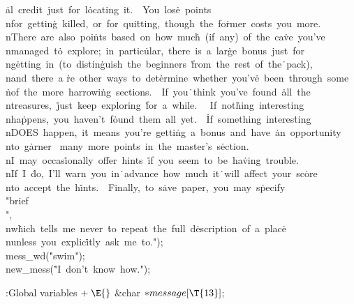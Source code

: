 \.{al\ credit\ just\ for\ l}\)\.{ocating\ it.\ \ You\ los}\)\.{e\ points\\nfor\ gettin}\)\.{g\ killed,\ or\ for\ qui}\)\.{tting,\ though\ the\ fo}\)\.{rmer\ costs\ you\ more.}\)\.{\\nThere\ are\ also\ poi}\)\.{nts\ based\ on\ how\ muc}\)\.{h\ (if\ any)\
of\ the\ ca}\)\.{ve\ you've\\nmanaged\ t}\)\.{o\ explore;\ in\ partic}\)\.{ular,\ there\ is\ a\ lar}\)\.{ge\ bonus\ just\ for\\ng}\)\.{etting\ in\ (to\ distin}\)\.{guish\ the\ beginners\ }\)\.{from\ the\ rest\ of\ the}\)\.{\ pack),\\nand\ there\ a}\)%
\.{re\ other\ ways\ to\ det}\)\.{ermine\ whether\ you'v}\)\.{e\ been\ through\ some\\}\)\.{nof\ the\ more\ harrowi}\)\.{ng\ sections.\ \ If\ you}\)\.{\ think\ you've\ found\ }\)\.{all\ the\\ntreasures,\ }\)\.{just\ keep\ exploring\ }\)\.{for\ a\ while.\ %
\ If\ not}\)\.{hing\ interesting\\nha}\)\.{ppens,\ you\ haven't\ f}\)\.{ound\ them\ all\ yet.\ \ }\)\.{If\ something\ interes}\)\.{ting\\nDOES\ happen,\ i}\)\.{t\ means\ you're\ getti}\)\.{ng\ a\ bonus\ and\ have\ }\)\.{an\ opportunity\\nto\ g}\)\.{arner%
\ many\ more\ poin}\)\.{ts\ in\ the\ master's\ s}\)\.{ection.\\nI\ may\ occas}\)\.{ionally\ offer\ hints\ }\)\.{if\ you\ seem\ to\ be\ ha}\)\.{ving\ trouble.\\nIf\ I\ }\)\.{do,\ I'll\ warn\ you\ in}\)\.{\ advance\ how\ much\ it}\)\.{\ will\ affect\ your\
sc}\)\.{ore\\nto\ accept\ the\ h}\)\.{ints.\ \ Finally,\ to\ s}\)\.{ave\ paper,\ you\ may\ s}\)\.{pecify\ \\"brief\\",\\nw}\)\.{hich\ tells\ me\ never\ }\)\.{to\ repeat\ the\ full\ d}\)\.{escription\ of\ a\ plac}\)\.{e\\nunless\ you\ explic}\)\.{itly\
ask\ me\ to."});\6
\\{mess\_wd}(\.{"swim"});\6
\\{new\_mess}(\.{"I\ don't\ know\ how."});\par
\fi

\B{}:Global variables\X${}\mathrel+\E{}$\6
\&{char} ${}{*}\\{message}[\T{13}]{}$;\par
\fi

